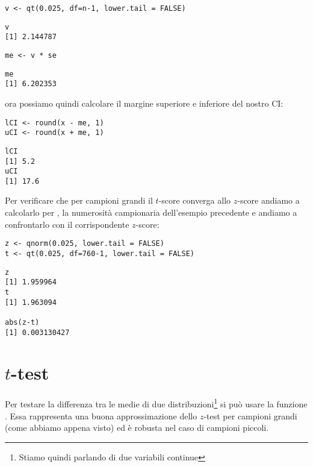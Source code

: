 \begin{lstlisting}[style=Rstylescript]
v <- qt(0.025, df=n-1, lower.tail = FALSE)
\end{lstlisting}

\begin{lstlisting}[style=Rstyle]
v
[1] 2.144787
\end{lstlisting}

\begin{lstlisting}[style=Rstylescript]
me <- v * se
\end{lstlisting}

\begin{lstlisting}[style=Rstyle]
me
[1] 6.202353
\end{lstlisting}
%
ora possiamo quindi calcolare il margine superiore e inferiore del nostro CI:

\begin{lstlisting}[style=Rstylescript]
lCI <- round(x - me, 1)
uCI <- round(x + me, 1)
\end{lstlisting}

\begin{lstlisting}[style=Rstyle]
lCI
[1] 5.2
uCI
[1] 17.6
\end{lstlisting}
%
Per verificare che per campioni grandi il $t$-score converga allo $z$-score andiamo a calcolarlo per , la numerosit\`a campionaria dell'esempio precedente e andiamo a confrontarlo con il corrispondente $z$-score:


\begin{lstlisting}[style=Rstyle]
z <- qnorm(0.025, lower.tail = FALSE)
t <- qt(0.025, df=760-1, lower.tail = FALSE)
\end{lstlisting}

\begin{lstlisting}[style=Rstyle]
z
[1] 1.959964
t
[1] 1.963094

abs(z-t)
[1] 0.003130427
\end{lstlisting}


\section{$t$-test}

Per testare la differenza tra le medie di due distribuzioni\footnote{Stiamo quindi parlando di due variabili continue} si pu\`o usare la funzione . Essa rappresenta una buona approssimazione dello $z$-test per campioni grandi (come abbiamo appena visto) ed \`e robusta nel caso di campioni piccoli.

